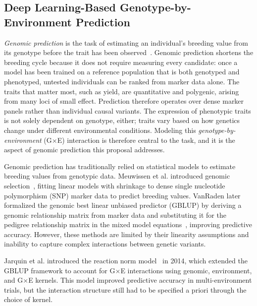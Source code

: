 \subsection{Deep Learning-Based Genotype-by-Environment Prediction}\label{sec:ch1-genomicpred}
\textit{Genomic prediction} is the task of estimating an individual's breeding value from its genotype before the trait has been observed~\cite{crossa2017genomic}. Genomic prediction shortens the breeding cycle because it does not require measuring every candidate: once a model has been trained on a reference population that is both genotyped and phenotyped, untested individuals can be ranked from marker data alone. The traits that matter most, such as yield, are quantitative and polygenic, arising from many loci of small effect. Prediction therefore operates over dense marker panels rather than individual causal variants. The expression of phenotypic traits is not solely dependent on genotype, either; traits vary based on how genetics change under different environmental conditions. Modeling this \textit{genotype-by-environment} (G$\times$E) interaction is therefore central to the task, and it is the aspect of genomic prediction this proposal addresses.

Genomic prediction has traditionally relied on statistical models to estimate breeding values from genotypic data. Meuwissen et al. introduced genomic selection~\cite{meuwissen2001prediction}, fitting linear models with shrinkage to dense single nucleotide polymorphism (SNP) marker data to predict breeding values. VanRaden later formalized the genomic best linear unbiased predictor (GBLUP) by deriving a genomic relationship matrix from marker data and substituting it for the pedigree relationship matrix in the mixed model equations~\cite{vanraden2008efficient}, improving predictive accuracy. However, these methods are limited by their linearity assumptions and inability to capture complex interactions between genetic variants.

Jarquin et al. introduced the reaction norm model~\cite{jarquin2014reaction} in 2014, which extended the GBLUP framework to account for G$\times$E interactions using genomic, environment, and G$\times$E kernels. This model improved predictive accuracy in multi-environment trials, but the interaction structure still had to be specified a priori through the choice of kernel.

